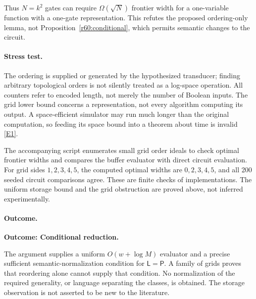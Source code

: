 \documentclass[11pt,a4paper]{article}
\newcommand{\eref}[2]{\hyperlink{extra:#1:#2}{[E#2]}}
\numberwithin{equation}{section}
\begin{document}
Thus $N=k^2$ gates can require $\Omega(\sqrt N)$ frontier width for a one-variable function with a one-gate representation. This refutes the proposed ordering-only lemma, not Proposition~\ref{r60:conditional}, which permits semantic changes to the circuit.

\paragraph{Stress test.}
The ordering is supplied or generated by the hypothesized transducer; finding arbitrary topological orders is not silently treated as a log-space operation. All counters refer to encoded length, not merely the number of Boolean inputs. The grid lower bound concerns a representation, not every algorithm computing its output. A space-efficient simulator may run much longer than the original computation, so feeding its space bound into a theorem about time is invalid \eref{60}{1}.

The accompanying script enumerates small grid order ideals to check optimal frontier widths and compares the buffer evaluator with direct circuit evaluation. For grid sides $1,2,3,4,5$, the computed optimal widths are $0,2,3,4,5$, and all 200 seeded circuit comparisons agree. These are finite checks of implementations. The uniform storage bound and the grid obstruction are proved above, not inferred experimentally.

\paragraph{Outcome.}
\textbf{Outcome: Conditional reduction.}

The argument supplies a uniform $O(w+\log M)$ evaluator and a precise sufficient semantic-normalization condition for $\mathsf L=\mathsf P$. A family of grids proves that reordering alone cannot supply that condition. No normalization of the required generality, or language separating the classes, is obtained. The storage observation is not asserted to be new to the literature.

\end{document}
